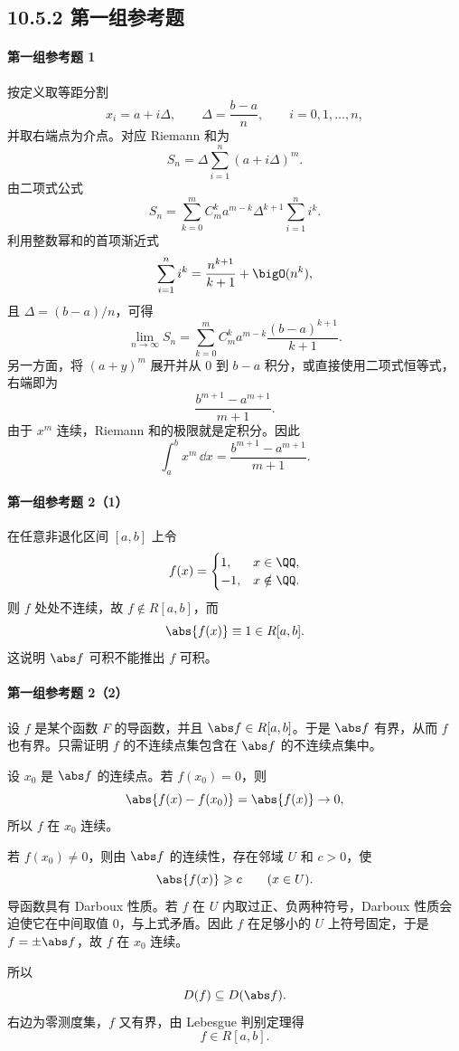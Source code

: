 \subsection*{10.5.2 第一组参考题}

\paragraph{第一组参考题 1}
\begin{xsolution}
按定义取等距分割
\[
  x_i=a+i\Delta,
  \qquad
  \Delta=\frac{b-a}{n},
  \qquad i=0,1,\ldots,n,
\]
并取右端点为介点。对应 Riemann 和为
\[
  S_n=\Delta\sum_{i=1}^n(a+i\Delta)^m.
\]
由二项式公式
\[
  S_n=\sum_{k=0}^m C_m^k a^{m-k}\Delta^{k+1}
  \sum_{i=1}^n i^k.
\]
利用整数幂和的首项渐近式
\[
  \sum_{i=1}^n i^k=\frac{n^{k+1}}{k+1}+\bigO(n^k),
\]
且 $\Delta=(b-a)/n$，可得
\[
  \lim_{n\to\infty}S_n
  =\sum_{k=0}^m C_m^k a^{m-k}
  \frac{(b-a)^{k+1}}{k+1}.
\]
另一方面，将 $(a+y)^m$ 展开并从 $0$ 到 $b-a$ 积分，或直接使用二项式恒等式，右端即为
\[
  \frac{b^{m+1}-a^{m+1}}{m+1}.
\]
由于 $x^m$ 连续，Riemann 和的极限就是定积分。因此
\[
  \boxed{\int_a^b x^m\,\dd x=
  \frac{b^{m+1}-a^{m+1}}{m+1}}.
\]
\end{xsolution}

\paragraph{第一组参考题 2（1）}
\begin{xsolution}
在任意非退化区间 $[a,b]$ 上令
\[
  f(x)=
  \begin{cases}
    1,&x\in\QQ,\\
    -1,&x\notin\QQ.
  \end{cases}
\]
则 $f$ 处处不连续，故 $f\notin R[a,b]$，而
\[
  \abs{f(x)}\equiv1\in R[a,b].
\]
这说明 $\abs f$ 可积不能推出 $f$ 可积。
\end{xsolution}

\paragraph{第一组参考题 2（2）}
\begin{xsolution}
设 $f$ 是某个函数 $F$ 的导函数，并且 $\abs f\in R[a,b]$。于是 $\abs f$ 有界，从而 $f$ 也有界。只需证明 $f$ 的不连续点集包含在 $\abs f$ 的不连续点集中。

设 $x_0$ 是 $\abs f$ 的连续点。若 $f(x_0)=0$，则
\[
  \abs{f(x)-f(x_0)}=\abs{f(x)}\to0,
\]
所以 $f$ 在 $x_0$ 连续。

若 $f(x_0)\ne0$，则由 $\abs f$ 的连续性，存在邻域 $U$ 和 $c>0$，使
\[
  \abs{f(x)}\geqslant c\qquad(x\in U).
\]
导函数具有 Darboux 性质。若 $f$ 在 $U$ 内取过正、负两种符号，Darboux 性质会迫使它在中间取值 $0$，与上式矛盾。因此 $f$ 在足够小的 $U$ 上符号固定，于是 $f=\pm\abs f$，故 $f$ 在 $x_0$ 连续。

所以
\[
  D(f)\subseteq D(\abs f).
\]
右边为零测度集，$f$ 又有界，由 Lebesgue 判别定理得
\[
  \boxed{f\in R[a,b]}.
\]
\end{xsolution}

